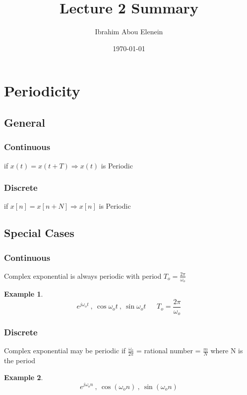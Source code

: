 \documentclass[11pt,a4paper]{article}
\theoremstyle{definition}
\newtheorem{ex}{Example}
\begin{document}
\author{Ibrahim Abou Elenein}
\title{Lecture 2 Summary}
\date {\today}
\maketitle

\section{Periodicity}
\subsection{General}
\subsubsection{Continuous} 
    
if $ x(t) = x(t+T) \Longrightarrow x(t)$ is Periodic 
    
    
\subsubsection{Discrete}
    
if $ x[n] = x[n+N] \Longrightarrow x[n]$ is Periodic  
\subsection{Special Cases}
\subsubsection{Continuous}
Complex exponential is always periodic with period $ T_o = \frac{2\pi}{\omega _ o}$ \par

\begin{ex}
\[
    e^{j\omega_o t} \ , \  \cos \omega_o t \ ,  \ \sin \omega _o t
     \ \ \ \ \ \ \ T_o = \frac{2\pi}{\omega _o}
\]
\end{ex}

\subsubsection{Discrete}
Complex exponential may be periodic if $\frac{\omega _o}{2\pi}$ = rational number = $\frac{m}{N}$ where N is the period  

\begin{ex}
    \[
        e ^{j\omega_o n} \ , \ \cos(\omega _o n) \ , \ \sin(\omega _o n)
    \]
\end{ex}
\end{document}
